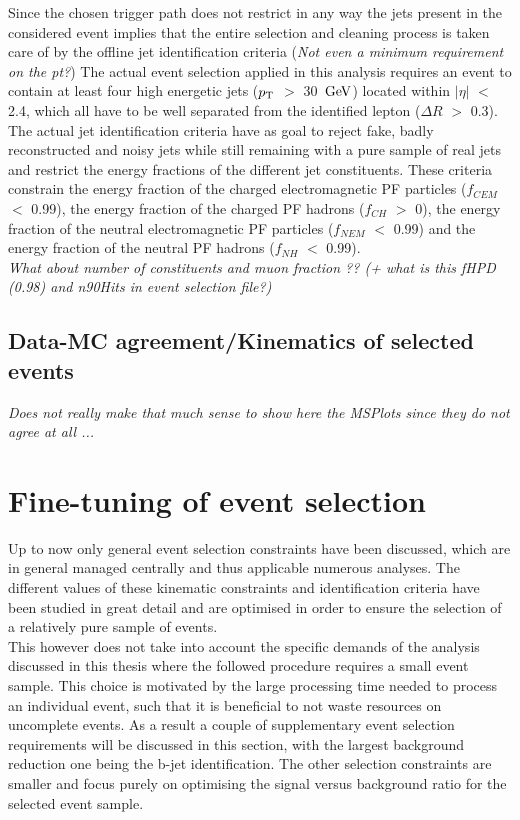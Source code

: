 Since the chosen trigger path does not restrict in any way the jets present in the considered event implies that the entire selection and cleaning process is taken care of by the offline jet identification criteria (\textit{Not even a minimum requirement on the pt?})
The actual event selection applied in this analysis requires an event to contain at least four high energetic jets ($p_{\rm T}$ $>$ 30 $\, \mathrm{GeV}$) located within $\vert \eta \vert$ $<$ 2.4, which all have to be well separated from the identified lepton ($\Delta R$ $>$ 0.3).
The actual jet identification criteria have as goal to reject fake, badly reconstructed and noisy jets while still remaining with a pure sample of real jets and restrict the energy fractions of the different jet constituents. These criteria constrain the energy fraction of the charged electromagnetic PF particles ($f_{CEM}$ $<$ 0.99), the energy fraction of the charged PF hadrons ($f_{CH}$ $>$ 0), the energy fraction of the neutral electromagnetic PF particles ($f_{NEM}$ $<$ 0.99) and the energy fraction of the neutral PF hadrons ($f_{NH}$ $<$ 0.99).
\\

\textit{What about number of constituents and muon fraction ?? (+ what is this fHPD (0.98) and n90Hits in event selection file?)}

\subsection{Data-MC agreement/Kinematics of selected events}
\textit{Does not really make that much sense to show here the MSPlots since they do not agree at all ...}

\section{Fine-tuning of event selection}\label{sec::SpecificSelec}
Up to now only general event selection constraints have been discussed, which are in general managed centrally and thus applicable numerous analyses. The different values of these kinematic constraints and identification criteria have been studied in great detail and are optimised in order to ensure the selection of a relatively pure sample of events.
\\
This however does not take into account the specific demands of the analysis discussed in this thesis where the followed procedure requires a small event sample. 
This choice is motivated by the large processing time needed to process an individual event, such that it is beneficial to not waste resources on uncomplete events.
As a result a couple of supplementary event selection requirements will be discussed in this section, with the largest background reduction one being the b-jet identification. The other selection constraints are smaller and focus purely on optimising the signal versus background ratio for the selected event sample.

